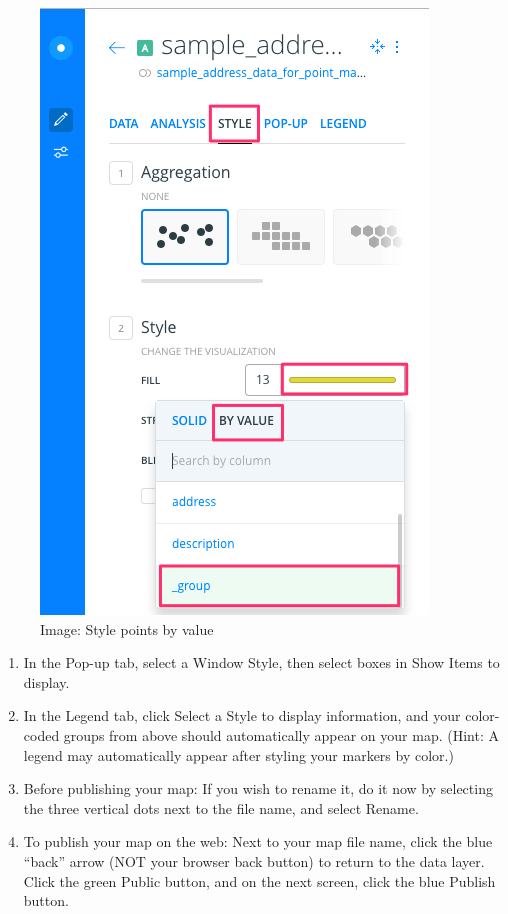 \documentclass[
  english,
]{book}
\begin{document}
\begin{figure}
\centering
\includegraphics{images/06-map/carto-point-style-value.png}
\caption{Image: Style points by value}
\end{figure}

\begin{enumerate}
\def\labelenumi{\arabic{enumi})}
\setcounter{enumi}{15}
\item
  In the Pop-up tab, select a Window Style, then select boxes in Show Items to display.
\item
  In the Legend tab, click Select a Style to display information, and your color-coded groups from above should automatically appear on your map. (Hint: A legend may automatically appear after styling your markers by color.)
\item
  Before publishing your map: If you wish to rename it, do it now by selecting the three vertical dots next to the file name, and select Rename.
\item
  To publish your map on the web: Next to your map file name, click the blue ``back'' arrow (NOT your browser back button) to return to the data layer. Click the green Public button, and on the next screen, click the blue Publish button.
\end{enumerate}
\end{document}
